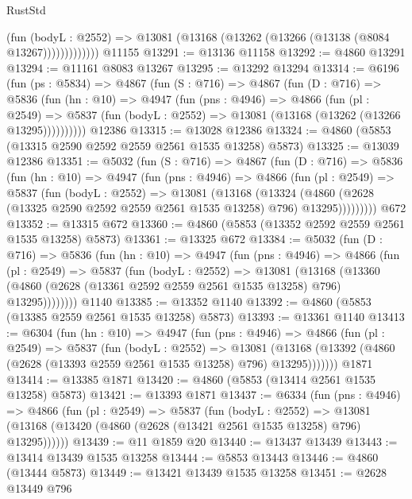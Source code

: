 \begin{lexlean}{RustStd}
\begin{coremodule}
                  (fun (bodyL : @2552) =>
                  @13081 (@13168 (@13262 (@13266 (@13138 (@8084 @13267)))))))))))))
    @11155
@13291 := @13136 @11158
@13292 := @4860 @13291
@13294 := @11161 @8083 @13267
@13295 := @13292 @13294
@13314 := @6196
    (fun (ps : @5834) =>
    @4867
      (fun (S : @716) =>
      @4867
        (fun (D : @716) =>
        @5836
          (fun (hn : @10) =>
          @4947
            (fun (pns : @4946) =>
            @4866
              (fun (pl : @2549) =>
              @5837 (fun (bodyL : @2552) => @13081 (@13168 (@13262 (@13266 @13295))))))))))
    @12386
@13315 := @13028 @12386
@13324 := @4860 (@5853 (@13315 @2590 @2592 @2559 @2561 @1535 @13258) @5873)
@13325 := @13039 @12386
@13351 := @5032
    (fun (S : @716) =>
    @4867
      (fun (D : @716) =>
      @5836
        (fun (hn : @10) =>
        @4947
          (fun (pns : @4946) =>
          @4866
            (fun (pl : @2549) =>
            @5837
              (fun (bodyL : @2552) =>
              @13081
                (@13168
                  (@13324
                    (@4860
                      (@2628 (@13325 @2590 @2592 @2559 @2561 @1535 @13258) @796)
                      @13295)))))))))
    @672
@13352 := @13315 @672
@13360 := @4860 (@5853 (@13352 @2592 @2559 @2561 @1535 @13258) @5873)
@13361 := @13325 @672
@13384 := @5032
    (fun (D : @716) =>
    @5836
      (fun (hn : @10) =>
      @4947
        (fun (pns : @4946) =>
        @4866
          (fun (pl : @2549) =>
          @5837
            (fun (bodyL : @2552) =>
            @13081
              (@13168
                (@13360 (@4860 (@2628 (@13361 @2592 @2559 @2561 @1535 @13258) @796) @13295))))))))
    @1140
@13385 := @13352 @1140
@13392 := @4860 (@5853 (@13385 @2559 @2561 @1535 @13258) @5873)
@13393 := @13361 @1140
@13413 := @6304
    (fun (hn : @10) =>
    @4947
      (fun (pns : @4946) =>
      @4866
        (fun (pl : @2549) =>
        @5837
          (fun (bodyL : @2552) =>
          @13081 (@13168 (@13392 (@4860 (@2628 (@13393 @2559 @2561 @1535 @13258) @796) @13295)))))))
    @1871
@13414 := @13385 @1871
@13420 := @4860 (@5853 (@13414 @2561 @1535 @13258) @5873)
@13421 := @13393 @1871
@13437 := @6334
    (fun (pns : @4946) =>
    @4866
      (fun (pl : @2549) =>
      @5837
        (fun (bodyL : @2552) =>
        @13081 (@13168 (@13420 (@4860 (@2628 (@13421 @2561 @1535 @13258) @796) @13295))))))
@13439 := @11 @1859 @20
@13440 := @13437 @13439
@13443 := @13414 @13439 @1535 @13258
@13444 := @5853 @13443
@13446 := @4860 (@13444 @5873)
@13449 := @13421 @13439 @1535 @13258
@13451 := @2628 @13449 @796

\end{coremodule}
\end{lexlean}
